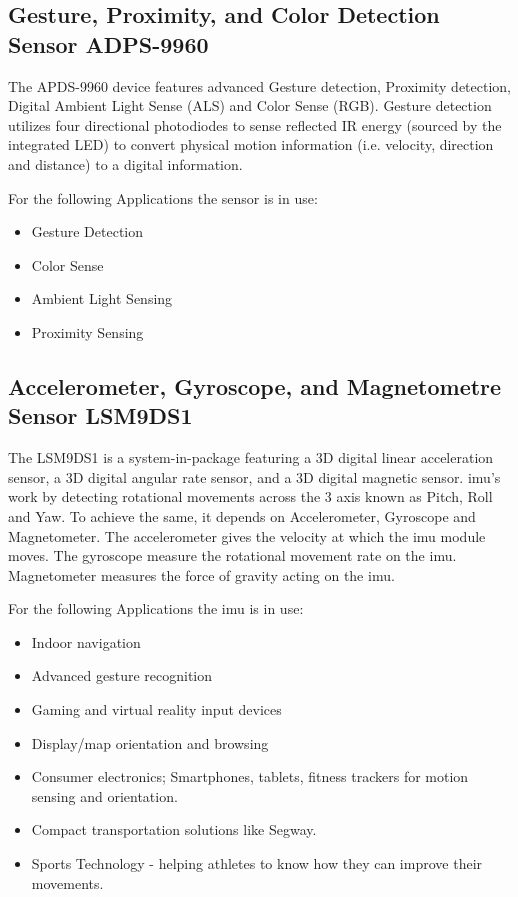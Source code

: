 \subsection{Gesture, Proximity, and Color Detection Sensor ADPS-9960}

The APDS-9960 device features advanced Gesture detection, Proximity detection, Digital Ambient Light Sense (ALS) and Color Sense (RGB). \cite{Arduino:2021} Gesture detection utilizes four directional photodiodes to sense reflected IR energy (sourced by the integrated LED) to convert physical motion information (i.e. velocity, direction and distance) to a digital information.

For the following Applications the sensor is in use:

\begin{itemize}
    \item Gesture Detection
    \item Color Sense
    \item Ambient Light Sensing
    \item Proximity Sensing
\end{itemize}

\subsection{Accelerometer, Gyroscope, and Magnetometre Sensor LSM9DS1}

The LSM9DS1 is a system-in-package featuring a 3D digital linear acceleration sensor, a 3D digital angular rate sensor, and a 3D digital magnetic sensor. \ac{imu}'s work by detecting rotational movements across the 3 axis known as Pitch, Roll and Yaw. To achieve the same, it depends on Accelerometer, Gyroscope and Magnetometer. The accelerometer gives the velocity at which the \ac{imu} module moves. The gyroscope measure the rotational movement rate on the \ac{imu}. Magnetometer measures the force of gravity acting on the \ac{imu}.

For the following Applications the \ac{imu} is in use:


\begin{itemize}
  \item Indoor navigation
  \item Advanced gesture recognition
  \item Gaming and virtual reality input devices
  \item Display/map orientation and browsing
  \item Consumer electronics; Smartphones, tablets, fitness trackers for motion sensing and orientation.
  \item Compact transportation solutions like Segway.
  \item Sports Technology - helping athletes to know how they can improve their movements.
\end{itemize}


